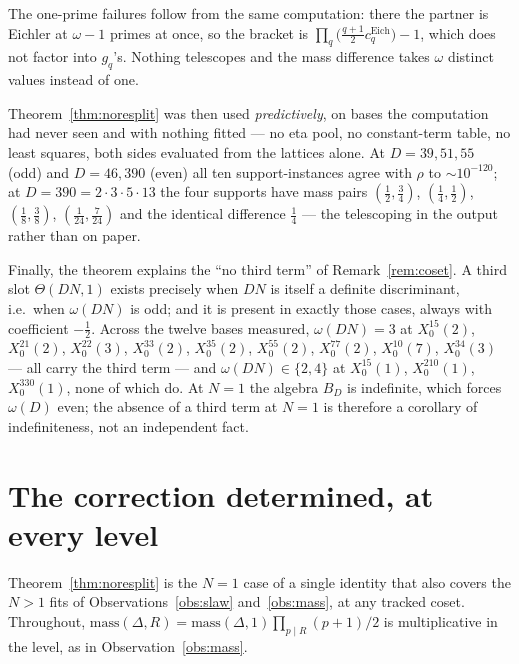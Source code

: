 \documentclass[11pt,reqno]{amsart}
\theoremstyle{plain}
\theoremstyle{definition}
\begin{document}
The one-prime failures follow from the same computation: there the partner is Eichler at
$\omega-1$ primes at once, so the bracket is $\prod_q\bigl(\tfrac{q+1}2
c_q^{\mathrm{Eich}}\bigr)-1$, which does not factor into $g_q$'s. Nothing telescopes and
the mass difference takes $\omega$ distinct values instead of one.

Theorem~\ref{thm:noresplit} was then used \emph{predictively}, on bases the computation had
never seen and with nothing fitted --- no eta pool, no constant-term table, no least
squares, both sides evaluated from the lattices alone. At $D=39,51,55$ (odd) and $D=46,390$
(even) all ten support-instances agree with $\rho$ to $\sim10^{-120}$; at $D=390=2\cdot3\cdot5\cdot13$
the four supports have mass pairs $(\tfrac12,\tfrac34)$, $(\tfrac14,\tfrac12)$,
$(\tfrac18,\tfrac38)$, $(\tfrac1{24},\tfrac7{24})$ and the identical difference $\tfrac14$
--- the telescoping in the output rather than on paper.

Finally, the theorem explains the ``no third term'' of Remark~\ref{rem:coset}. A third
slot $\Theta(DN,1)$ exists precisely when $DN$ is itself a definite discriminant, i.e.\
when $\omega(DN)$ is odd; and it is present in exactly those cases, always with
coefficient $-\tfrac12$. Across the twelve bases measured, $\omega(DN)=3$ at
$X_0^{15}(2)$, $X_0^{21}(2)$, $X_0^{22}(3)$, $X_0^{33}(2)$, $X_0^{35}(2)$, $X_0^{55}(2)$,
$X_0^{77}(2)$, $X_0^{10}(7)$, $X_0^{34}(3)$ --- all carry the third term --- and
$\omega(DN)\in\{2,4\}$ at $X_0^{15}(1)$, $X_0^{210}(1)$, $X_0^{330}(1)$, none of which do.
At $N=1$ the algebra $B_D$ is indefinite, which forces $\omega(D)$ even; the absence of a
third term at $N=1$ is therefore a corollary of indefiniteness, not an independent fact.

\section{The correction determined, at every level}\label{sec:determined}

Theorem~\ref{thm:noresplit} is the $N=1$ case of a single identity that also covers the
$N>1$ fits of Observations~\ref{obs:slaw} and~\ref{obs:mass}, at any tracked coset.
Throughout, $\mathrm{mass}(\Delta,R)=\mathrm{mass}(\Delta,1)\prod_{p\mid R}(p+1)/2$ is
multiplicative in the level, as in Observation~\ref{obs:mass}.
\end{document}
